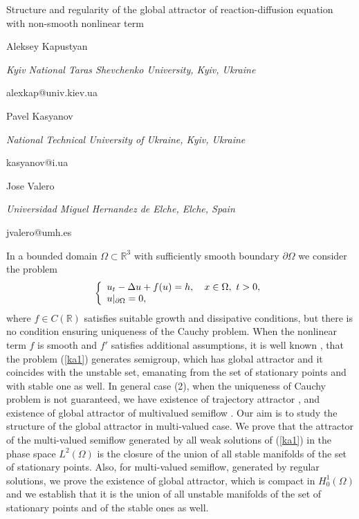 \documentclass[10pt,a4paper]{article}
\begin{document}
\begin{center}

{\Large Structure and regularity of the global attractor of reaction-diffusion equation with non-smooth nonlinear term}

\bigskip

{\sc Aleksey Kapustyan}

{\small\it Kyiv National Taras Shevchenko University, Kyiv, Ukraine}

{\small\rm alexkap@univ.kiev.ua}


\bigskip

{\sc Pavel Kasyanov}

{\small\it  National Technical University of Ukraine, Kyiv, Ukraine}

{\small\rm kasyanov@i.ua}

\bigskip

{\sc Jose Valero}

{\small\it Universidad Miguel Hernandez de Elche,  Elche, Spain}

{\small\rm jvalero@umh.es}

\end{center}

\bigskip


In a bounded domain $\Omega\subset\mathbb{R}^{3}$ with sufficiently
smooth boundary $\partial\Omega$ we consider the problem
\begin{equation}
\left\{
\begin{array}
[c]{l}%
u_{t}-\Delta u+f(u)=h,\quad x\in\Omega,\ t>0,\\
u|_{\partial\Omega}=0,
\end{array}
\right. \label{ka1}%
\end{equation}
where $f\in C(\mathbb{R})$ satisfies suitable growth and dissipative
conditions, but there is no condition ensuring uniqueness of the
Cauchy problem. When the nonlinear term $f$ is smooth and $f'$
satisfies additional assumptions, it is well known
\cite{BabinVishik1989}, that the problem (\ref{ka1}) generates semigroup,
which has global attractor and it coincides with the unstable set,
emanating from the set of stationary points and with stable one as
well. In general case (2), when the uniqueness of Cauchy problem is
not guaranteed, we have existence of trajectory attractor
\cite{ChepVishik2002}, and existence of global attractor of
multivalued semiflow \cite{KapValero2010}. Our aim is to study the
structure of the global attractor in multi-valued case. We prove
that the attractor of the multi-valued semiflow generated by all
weak solutions of (\ref{ka1}) in the phase space $L^{2}\left( \Omega\right)
$ is the closure of the union of all stable manifolds of the set of
stationary points. Also,
for multi-valued semiflow,
generated by regular solutions,  we prove the existence of  global
attractor,  which is compact in $H_{0}^{1}\left( \Omega\right) $ and
we establish that it is the union of all unstable manifolds of the
set of stationary points and of the stable ones as well.
\end{document}
